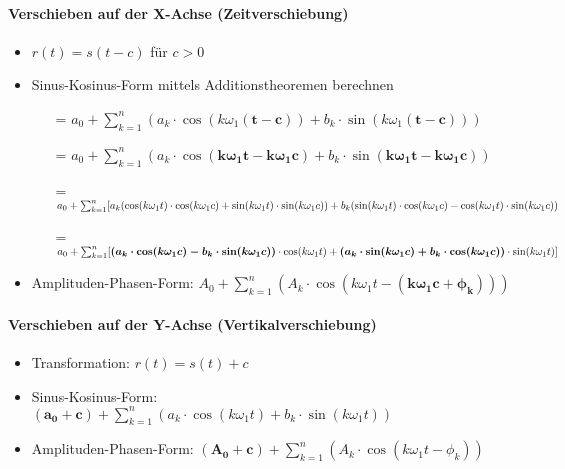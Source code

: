 \paragraph{Verschieben auf der X-Achse (Zeitverschiebung)}
\begin{itemize}
  \item $r(t) = s(t-c)$ für $c > 0$
  \item Sinus-Kosinus-Form mittels Additionstheoremen berechnen
    \begin{itemize}
      \item[=] $a_0 + \sum_{k=1}^{n} (a_k \cdot \cos(k \omega_1
        \boldsymbol{(t-c)}) + b_k \cdot \sin(k \omega_1 \boldsymbol{(t-c)}))$
      \item[=] $a_0 + \sum_{k=1}^{n}(
        a_k \cdot \cos(\boldsymbol{k \omega_1 t - k \omega_1 c}) +
        b_k \cdot \sin(\boldsymbol{k \omega_1 t - k \omega_1 c}))$
      \item[=] $a_0 + \sum_{k=1}^{n}[
        a_k (\cos(k \omega_1 t) \cdot \cos(k \omega_1 c) +
          \sin(k \omega_1 t) \cdot \sin(k \omega_1 c)) + \\
        b_k (\sin(k \omega_1 t) \cdot \cos(k \omega_1 c) -
          \cos(k \omega_1 t) \cdot \sin(k \omega_1 c))$
      \item[=] $a_0 + \sum_{k=1}^{n} [
        \boldsymbol{(a_k \cdot \cos(k \omega_1 c) -
        b_k \cdot \sin(k \omega_1 c))} \cdot \cos(k \omega_1 t) + \\
          \boldsymbol{(a_k \cdot \sin(k \omega_1 c) +
        b_k \cdot \cos(k \omega_1 c))} \cdot \sin(k \omega_1 t)]$
    \end{itemize}
  \item Amplituden-Phasen-Form: $A_0 + \sum_{k=1}^{n}
    (A_k \cdot \cos(k \omega_1 t - \boldsymbol{(k \omega_1 c + \phi_k)}))$
\end{itemize}
\paragraph{Verschieben auf der Y-Achse (Vertikalverschiebung)}
\begin{itemize}
  \item Transformation: $r(t) = s(t) + c$
  \item Sinus-Kosinus-Form: $\boldsymbol{(a_0 + c)} + \sum_{k=1}^{n} ( a_k \cdot
    \cos(k \omega_1 t) + b_k \cdot \sin(k \omega_1 t))$
  \item Amplituden-Phasen-Form: $\boldsymbol{(A_0 + c)} + \sum_{k=1}^{n}
    (A_k \cdot \cos(k \omega_1 t  - \phi_k))$
\end{itemize}


